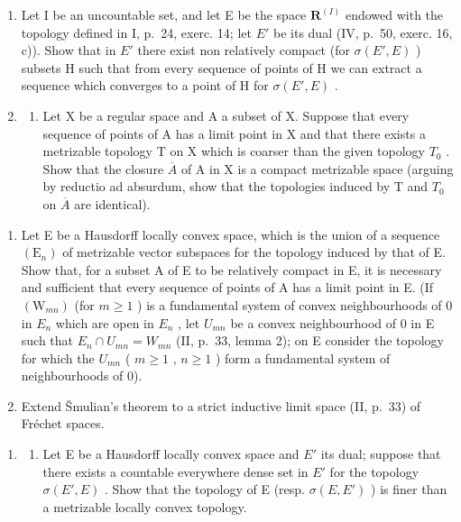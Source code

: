 \exercisegroup

\begin{enumerate}
\def\labelenumi{\arabic{enumi})}
\item
  Let I be an uncountable set, and let E be the space \(\mathbf{R}^{(I)}\) endowed with the topology defined in I, p.~24, exerc. 14; let \(E'\) be its dual (IV, p.~50, exerc. 16, c)). Show that in \(E'\) there exist non relatively compact (for \(\sigma(E', E)\) ) subsets H such that from every sequence of points of H we can extract a sequence which converges to a point of H for \(\sigma(E', E)\) .
\item
  \begin{enumerate}
  \def\labelenumii{\alph{enumii})}
  \tightlist
  \item
    Let X be a regular space and A a subset of X. Suppose that every sequence of points of A has a limit point in X and that there exists a metrizable topology T on X which is coarser than the given topology \(T_{0}\) . Show that the closure \(\overline{A}\) of A in X is a compact metrizable space (arguing by reductio ad absurdum, show that the topologies induced by T and \(T_{0}\) on \(\overline{A}\) are identical).
  \end{enumerate}
\end{enumerate}

\begin{enumerate}
\def\labelenumi{\alph{enumi})}
\setcounter{enumi}{1}
\item
  Let E be a Hausdorff locally convex space, which is the union of a sequence \((\mathrm{E}_{n})\) of metrizable vector subspaces for the topology induced by that of E. Show that, for a subset A of E to be relatively compact in E, it is necessary and sufficient that every sequence of points of A has a limit point in E. (If \((\mathrm{W}_{mn})\) (for \(m \geqslant 1\) ) is a fundamental system of convex neighbourhoods of 0 in \(E_{n}\) which are open in \(E_{n}\) , let \(U_{mn}\) be a convex neighbourhood of 0 in E such that \(E_{n} \cap U_{mn} = W_{mn}\) (II, p.~33, lemma 2); on E consider the topology for which the \(U_{mn}\) ( \(m \geqslant 1\) , \(n \geqslant 1\) ) form a fundamental system of neighbourhoods of 0).
\item
  Extend Šmulian's theorem to a strict inductive limit space (II, p.~33) of Fréchet spaces.
\end{enumerate}

\begin{enumerate}
\def\labelenumi{\arabic{enumi})}
\setcounter{enumi}{2}
\tightlist
\item
  \begin{enumerate}
  \def\labelenumii{\alph{enumii})}
  \tightlist
  \item
    Let E be a Hausdorff locally convex space and \(E'\) its dual; suppose that there exists a countable everywhere dense set in \(E'\) for the topology \(\sigma(E', E)\) . Show that the topology of E (resp. \(\sigma(E, E')\) ) is finer than a metrizable locally convex topology.
  \end{enumerate}
\end{enumerate}

